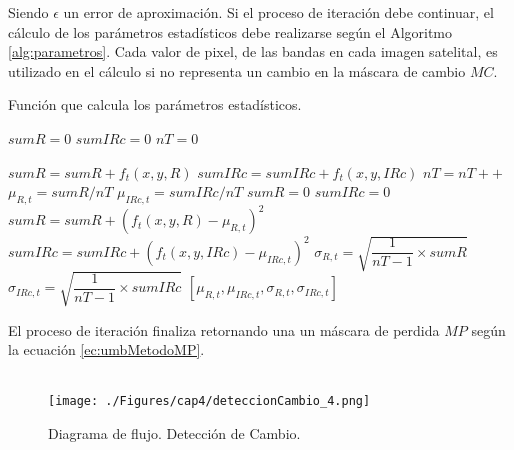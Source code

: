   Siendo $ \epsilon $ un error de aproximaci\'on. Si el proceso de iteraci\'on debe continuar, el c\'alculo  de los par\'ametros estad\'isticos debe realizarse seg\'un el Algoritmo \ref{alg:parametros}. Cada valor de pixel, de las bandas en cada imagen satelital, es utilizado en el c\'alculo si no representa un cambio en la m\'ascara de cambio $ MC $.
  \begin{algorithm}[H]
  	\caption{Funci\'on que calcula los par\'ametros estad\'isticos.}
  	\label{alg:parametros}
  	\begin{algorithmic}[1]
  		\Statex
		\State $sumR =0$ 
		\State $sumIRc =0 $ 
		\State $nT =0 $ 
		\Statex
													
					\State $sumR=sumR+f_{t}(x,y,R)$
					\State $sumIRc=sumIRc+f_{t}(x,y,IRc)$
					\State $nT=nT++$
				\EndIf
			\EndFor
		\EndFor
	\Statex
		\State $ \mu_{R,t}= sumR/nT$
		\State $ \mu_{IRc,t}= sumIRc/nT$
		\State $ sumR=0$
		\State $ sumIRc=0$
		\Statex
					\State $sumR=sumR+(f_{t}(x,y,R)-\mu_{R,t})^{2}$
					\State $sumIRc=sumIRc+(f_{t}(x,y,IRc)-\mu_{IRc,t})^{2}$
				\EndIf
			\EndFor
		\EndFor
		\Statex
		\State $\sigma_{R,t}=\sqrt{\dfrac{1}{nT-1} \times sumR}$
		\State $\sigma_{IRc,t}=\sqrt{\dfrac{1}{nT-1} \times sumIRc}$
  		\Statex
  		\Return $[\mu_{R,t},\mu_{IRc,t},\sigma_{R,t},\sigma_{IRc,t}]$
  		\EndFunction
  	\end{algorithmic}
  \end{algorithm}
El proceso de iteraci\'on finaliza retornando una un m\'ascara de perdida $ MP $ seg\'un la ecuaci\'on \ref{ec:umbMetodoMP}.\\~\\
\begin{figure}[H]
	\centering
	\texttt{[image: ./Figures/cap4/deteccionCambio\_4.png]}
	\caption{Diagrama de flujo. Detecci\'on de Cambio.}
	\label{fig:deteccionCambio}
\end{figure}

